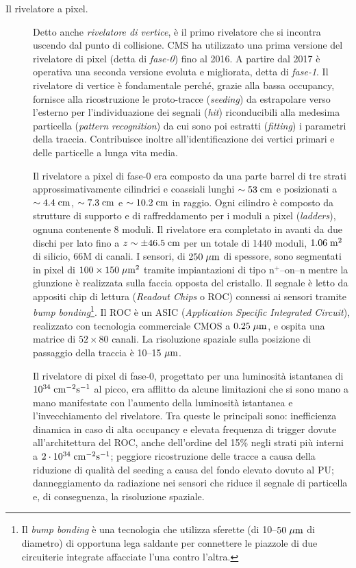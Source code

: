 \begin{description}

\item[Il rivelatore a pixel.] Detto anche {\em rivelatore di vertice}, \`e il primo rivelatore che si incontra uscendo dal punto di collisione. CMS ha utilizzato una prima versione del rivelatore di pixel (detta di {\em fase-0}) fino al 2016. A partire dal 2017 \`e operativa una seconda versione evoluta e migliorata, detta di {\em fase-1}. Il rivelatore di vertice \`e fondamentale perch\'e, grazie alla bassa occupancy, fornisce alla ricostruzione le proto-tracce ({\em seeding}) da estrapolare verso l'esterno per l'individuazione dei segnali ({\em hit}) riconducibili alla medesima particella ({\em pattern recognition}) da cui sono poi estratti ({\em fitting}) i parametri della traccia\cite{Chatrchyan:2014fea}. Contribuisce inoltre all'identificazione dei vertici primari e delle particelle a lunga vita media.
 
Il rivelatore a pixel di fase-0 era composto da una parte barrel di tre strati approssimativamente cilindrici e coassiali lunghi $\sim 53\rm \; cm$ e posizionati a $\sim 4.4\rm \; cm$, $\sim 7.3\rm \; cm$ e $\sim 10.2\rm \; cm$ in raggio. Ogni cilindro \`e composto da strutture di supporto e di raffreddamento per i moduli a pixel ({\em ladders}), ognuna contenente 8 moduli. Il rivelatore era completato in avanti da due dischi per lato fino a $z\sim\pm 46.5\rm \; cm$ per un totale di 1440 moduli, $1.06\rm \; m^2$ di silicio, 66M di canali. I sensori, di $250\; \mu \rm m$ di spessore, sono segmentati in pixel di $100\times150\; \mu \rm m^2$ tramite impiantazioni di tipo n$^+$--on--n mentre la giunzione \`e realizzata sulla faccia opposta del cristallo. Il segnale \`e letto da appositi chip di lettura ({\em Readout Chips} o ROC) connessi ai sensori tramite {\em bump bonding}\footnote{Il {\em bump bonding} \`e una tecnologia che utilizza sferette (di 10--$50\; \mu \rm m$ di diametro) di opportuna lega saldante per connettere le piazzole di due circuiterie integrate affacciate l'una contro l'altra.}. Il ROC \`e un ASIC ({\em Application Specific Integrated Circuit}), realizzato con tecnologia commerciale CMOS a $0.25\; \mu \rm m$, e ospita una matrice di $52\times80$ canali. La risoluzione spaziale sulla posizione di passaggio della traccia \`e 10--15$\; \mu \rm m$.

Il rivelatore di pixel di fase-0, progettato per una luminosit\`a istantanea di $10^{34}\rm \; cm^{-2}{\mathrm s}^{-1}$ al picco, era afflitto da alcune limitazioni che si sono mano a mano manifestate con l'aumento della luminosit\`a istantanea e l'invecchiamento del rivelatore. Tra queste le principali sono: inefficienza dinamica in caso di alta occupancy e elevata frequenza di trigger dovute all'architettura del ROC, anche dell'ordine del 15\% negli strati pi\`u interni a $2\cdot10^{34}\rm \; cm^{-2}{\mathrm s}^{-1}$; peggiore ricostruzione delle tracce a causa della riduzione di qualit\`a del seeding a causa del fondo elevato dovuto al PU; danneggiamento da radiazione nei sensori che riduce il segnale di particella e, di conseguenza, la risoluzione spaziale.


\end{description}
